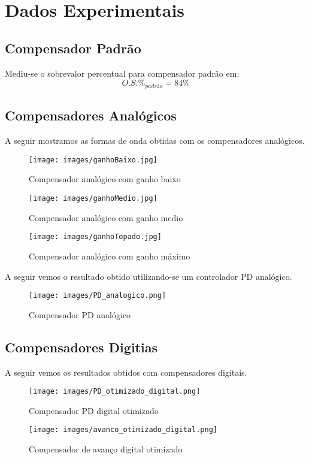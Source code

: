 \section{Dados Experimentais}
\subsection{Compensador Padrão}
Mediu-se o sobrevalor percentual para compensador padrão em:
\begin{equation}
    O.S.\%_{padrão} = 84\%
\end{equation}

\subsection{Compensadores Analógicos}

A seguir mostramos as formas de onda obtidas com os compensadores analógicos.

\begin{figure}[H]
\centering
\texttt{[image: images/ganhoBaixo.jpg]}
\caption{Compensador analógico com ganho baixo}
\label{fig:digital_blocks}
\end{figure}

\begin{figure}[H]
\centering
\texttt{[image: images/ganhoMedio.jpg]}
\caption{Compensador analógico com ganho medio}
\label{fig:digital_blocks}
\end{figure}

\begin{figure}[H]
\centering
\texttt{[image: images/ganhoTopado.jpg]}
\caption{Compensador analógico com ganho máximo}
\label{fig:digital_blocks}
\end{figure}

A seguir vemos o resultado obtido utilizando-se um controlador PD analógico.

\begin{figure}[H]
\centering
\texttt{[image: images/PD\_analogico.png]}
\caption{Compensador PD analógico}
\label{fig:digital_blocks}
\end{figure}

\subsection{Compensadores Digitias}

A seguir vemos os resultados obtidos com compensadores digitais.

\begin{figure}[H]
\centering
\texttt{[image: images/PD\_otimizado\_digital.png]}
\caption{Compensador PD digital otimizado}
\label{fig:digital_blocks}
\end{figure}

\begin{figure}[H]
\centering
\texttt{[image: images/avanco\_otimizado\_digital.png]}
\caption{Compensador de avanço digital otimizado}
\label{fig:digital_blocks}
\end{figure}


